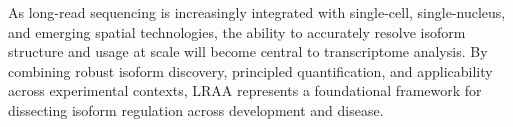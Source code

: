 As long-read sequencing is increasingly integrated with single-cell, single-nucleus, and emerging spatial technologies, the ability to accurately resolve isoform structure and usage at scale will become central to transcriptome analysis. By combining robust isoform discovery, principled quantification, and applicability across experimental contexts, LRAA represents a foundational framework for dissecting isoform regulation across development and disease.
